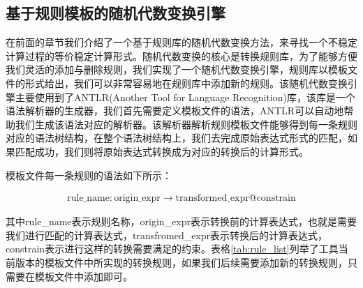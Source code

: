 \subsection{基于规则模板的随机代数变换引擎}

在前面的章节我们介绍了一个基于规则库的随机代数变换方法，来寻找一个不稳定计算过程的等价稳定计算形式。随机代数变换的核心是转换规则库，为了能够方便我们灵活的添加与删除规则，我们实现了一个随机代数变换引擎，规则库以模板文件的形式给出，我们可以非常容易地在规则库中添加新的规则。该随机代数变换引擎主要使用到了ANTLR(Another Tool for Language Recognition)库，该库是一个语法解析器的生成器，我们首先需要定义模板文件的语法，ANTLR可以自动地帮助我们生成该语法对应的解析器。该解析器解析规则模板文件能够得到每一条规则对应的语法树结构，在整个语法树结构上，我们去完成原始表达式形式的匹配，如果匹配成功，我们则将原始表达式转换成为对应的转换后的计算形式。

模板文件每一条规则的语法如下所示：

 \begin{gather*}
    \text{rule\_name} : \text{origin\_expr} \rightarrow \text{transformed\_expr} @ \text{constrain}
 \end{gather*}

 其中rule\_name表示规则名称，origin\_expr表示转换前的计算表达式，也就是需要我们进行匹配的计算表达式，transfromed\_expr表示转换后的计算表达式，constrain表示进行这样的转换需要满足的约束。表格\ref{tab:rule_list}列举了工具当前版本的模板文件中所实现的转换规则，如果我们后续需要添加新的转换规则，只需要在模板文件中添加即可。

